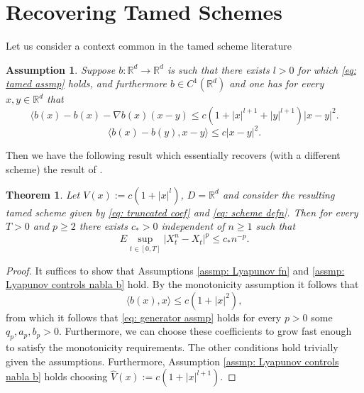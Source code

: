 \documentclass{article}
\newtheorem{thm}{Theorem}
\newtheorem{assmp}{Assumption}
\begin{document}
    \section{Recovering Tamed Schemes}\label{sec: recovering tamed schemes}
Let us consider a context common in the tamed scheme literature
\begin{assmp}\label{assmp: tamed schemes}
    Suppose $b:\mathbb{R}^d\to\mathbb{R}^d$ is such that there exists $l>0$ for which \eqref{eq: tamed assmp} holds, and furthermore $b\in C^1(\mathbb{R}^d)$ and one has for every $x,y\in \mathbb{R}^d$ that
  \begin{equation}
        \langle  b(x)- b(x) -\nabla b(x)( x-y)\leq c(1+\lvert x \rvert^{l+1}+\lvert y\rvert^{l+1})\lvert x -y\rvert^2.
    \end{equation}  
    \begin{equation}
        \langle b(x)-b(y), x-y\rangle\leq c\lvert x -y\rvert^2.
    \end{equation}
\end{assmp}
Then we have the following result which essentially recovers (with a different scheme) the result of \cite{articletamed}.
\begin{thm}\label{thm: recovering tamed scheme}
    Let $V(x):=c(1+\lvert x \rvert^l)$, $D=\mathbb{R}^d$ and consider the resulting tamed scheme given by \eqref{eq: truncated coef} and \eqref{eq: scheme defn}. Then for every $T>0$ and $p\geq 2$ there exists $c_*>0$ independent of $n\geq 1$ such that
    \begin{equation}
        E\sup_{t\in [0,T]}\lvert X^n_t-X_t\rvert^p \leq c_*n^{-p}.
    \end{equation}
\end{thm}
\begin{proof}
    It suffices to show that Assumptions \ref{assmp: Lyapunov fn} and \ref{assmp: Lyapunov controls nabla b} hold. By the monotonicity assumption it follows that
    \begin{equation}
\langle b(x), x\rangle\leq c(1+\lvert x \rvert^2),
\end{equation}
from which it follows that \eqref{eq: generator assmp} holds for every $p>0$ some $q_p,a_p,b_p>0$. Furthermore, we can choose these coefficients to grow fast enough to satisfy the monotonicity requirements. The other conditions hold trivially given the assumptions. Furthermore, Assumption \ref{assmp: Lyapunov controls nabla b} holds choosing $\hat{V}(x):=c(1+\lvert x \rvert^{l+1})$.
\end{proof}
\end{document}
